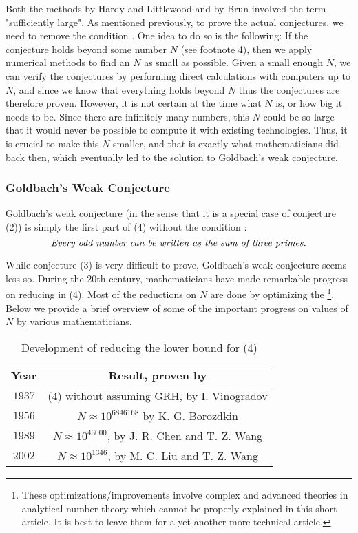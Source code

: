 \documentclass{article}
\begin{document}
Both the methods by Hardy and Littlewood and by Brun involved the term "sufficiently large". As mentioned previously, to prove the actual conjectures, we need to remove the condition . One idea to do so is the following: If the conjecture holds beyond some number $N$ (see footnote 4), then we apply numerical methods to find an $N$ as small as possible. Given a small enough $N$, we can verify the conjectures by performing direct calculations with computers up to $N$, and since we know that everything holds beyond $N$ thus the conjectures are therefore proven. However, it is not certain at the time what $N$ is, or how big it needs to be. Since there are infinitely many numbers, this $N$ could be so large that it would never be possible to compute it with existing technologies. Thus, it is crucial to make this $N$ smaller, and that is exactly what mathematicians did back then, which eventually led to the solution to Goldbach's weak conjecture.

\subsubsection*{Goldbach's Weak Conjecture}
Goldbach's weak conjecture (in the sense that it is a special case of conjecture (2)) is simply the first part of (4) without the condition :
\begin{equation}
    \emph{Every odd number can be written as the sum of three primes.}
\end{equation}

While conjecture (3) is very difficult to prove, Goldbach's weak conjecture seems less so.  During the 20th century, mathematicians have made remarkable progress on reducing  in (4). Most of the reductions on $N$ are done by optimizing the \footnote{These optimizations/improvements involve complex and advanced theories in analytical number theory which cannot be properly explained in this short article. It is best to leave them for a yet another more technical article.}. Below we provide a brief overview of some of the important progress on values of $N$ by various mathematicians.
\begin{table}[h]
\centering
\begin{tabular}{|c|c|}
\hline
\textbf{Year} & \textbf{Result, proven by} \\ \hline
$1937$ & (4) without assuming GRH, by I. Vinogradov\footnotemark{} \\ \hline
$1956$ & $N \approx 10^{6846168}$ by K. G. Borozdkin \\ \hline
$1989$ & $N \approx 10^{43000}$, by J. R. Chen and T. Z. Wang \\ \hline
$2002$ & $N \approx 10^{1346}$, by M. C. Liu and T. Z. Wang\\ \hline
\end{tabular}
\caption{Development of reducing the lower bound for (4)\cite{wang}}
\end{table}
\end{document}
